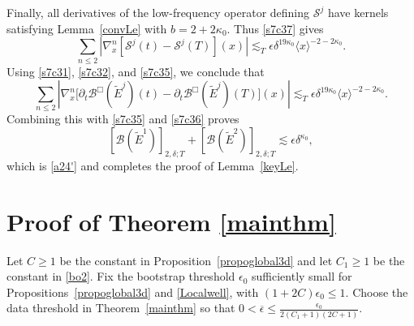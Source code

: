 \documentclass[reqno,11pt]{amsart}
\numberwithin{equation}{section}
\def\bar{\overline}
\def\bar{\overline}
\begin{document}
Finally, all derivatives of the low-frequency operator
defining $\mathcal S^j$ have kernels satisfying
Lemma~\ref{convLe} with $b=2+2\kappa_0$.
Thus \eqref{s7c37} gives
\[
\sum_{n\leq2}
|\nabla_x^n[\mathcal S^j(t)-\mathcal S^j(T)](x)|
\lesssim_T\epsilon\delta^{19\kappa_0}
\langle x\rangle^{-2-2\kappa_0}.
\]
Using \eqref{s7c31}, \eqref{s7c32}, and \eqref{s7c35},
we conclude that
\[
\sum_{n\leq2}
\left|\nabla_x^n
\big[\partial_t\mathcal B^\Box(\tilde E^j)(t)
-\partial_t\mathcal B^\Box(\tilde E^j)(T)\big](x)\right|
\lesssim_T\epsilon\delta^{19\kappa_0}
\langle x\rangle^{-2-2\kappa_0}.
\]
Combining this with \eqref{s7c35} and \eqref{s7c36} proves
\[
[\mathcal B(\tilde E^1)]_{2,\delta;T}
+[\mathcal B(\tilde E^2)]_{2,\delta;T}
\lesssim\epsilon\delta^{\kappa_0},
\]
which is \eqref{a24'} and completes the proof of
Lemma~\ref{keyLe}.
	
	
\section{Proof of Theorem \ref{mainthm}}

Let $C\geq1$ be the constant in Proposition~\ref{propoglobal3d}
and let $C_1\geq1$ be the constant in \eqref{bo2}.
Fix the bootstrap threshold $\epsilon_0$ sufficiently small for
Propositions~\ref{propoglobal3d} and \ref{Localwell}, with
$(1+2C)\epsilon_0\leq1$. Choose the data threshold in
Theorem~\ref{mainthm} so that
$0<\bar\epsilon\leq
\frac{\epsilon_0}{2(C_1+1)(2C+1)}.$
\medskip
\end{document}
